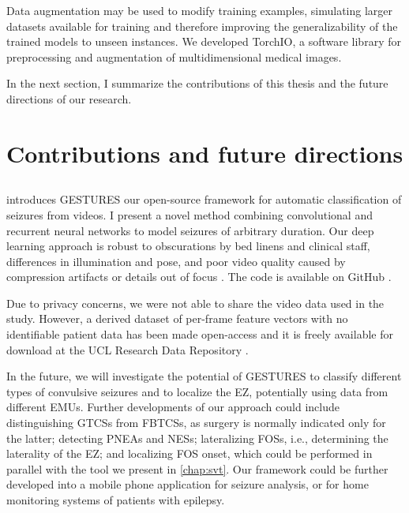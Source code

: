 Data augmentation may be used to modify training examples, simulating larger datasets available for training and therefore improving the generalizability of the trained models to unseen instances.
We developed TorchIO, a software library for preprocessing and augmentation of multidimensional medical images.

In the next section, I summarize the contributions of this thesis and the future directions of our research.


\section{Contributions and future directions}

\subsection{}

 introduces \ac{GESTURES} our open-source framework for automatic classification of seizures from videos.
I present a novel method combining convolutional and recurrent neural networks to model seizures of arbitrary duration.
Our deep learning approach is robust to obscurations by bed linens and clinical staff, differences in illumination and pose, and poor video quality caused by compression artifacts or details out of focus \cite{perez-garcia_transfer_2021}.
The code is available on GitHub%
.

Due to privacy concerns, we were not able to share the video data used in the study.
However, a derived dataset of per-frame feature vectors with no identifiable patient data has been made open-access and it is freely available for download at the UCL Research Data Repository \cite{perez-garcia_data_2021}.

In the future, we will investigate the potential of \ac{GESTURES} to classify different types of convulsive seizures and to localize the \ac{EZ}, potentially using data from different \acp{EMU}.
Further developments of our approach could include
distinguishing \acp{GTCS} from \acp{FBTCS}, as surgery is normally indicated only for the latter;
detecting \acp{PNEA} and \acp{NES};
lateralizing \acp{FOS}, i.e., determining the laterality of the \ac{EZ};
and localizing \ac{FOS} onset, which could be performed in parallel with the tool we present in \cref{chap:svt}.
Our framework could be further developed into a mobile phone application for seizure analysis, or for home monitoring systems of patients with epilepsy.


